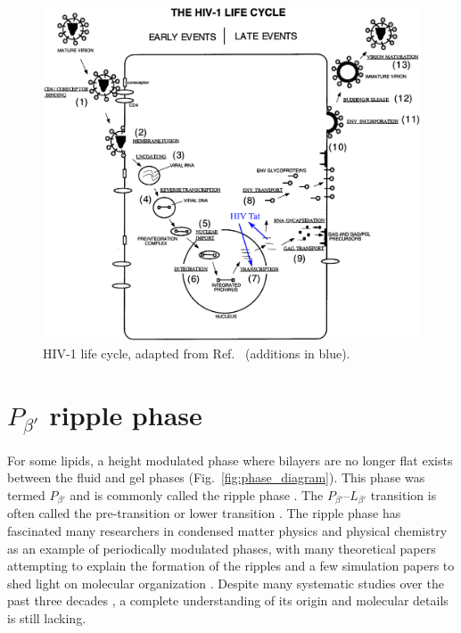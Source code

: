\begin{figure}[htbp]
  \centering
  \includegraphics[width=\textwidth]{figures/HIV_lifecycle}
  \caption{HIV-1 life cycle, adapted from Ref.~\cite{Freed98}
  (additions in blue).}
  \label{fig:HIV_lifecycle}
\end{figure}

\section{$P_{\beta'}$ ripple phase}
For some lipids, a height modulated phase where
bilayers are no longer flat exists between the fluid and gel phases
(Fig.~\ref{fig:phase_diagram}). 
This phase was termed $P_{\beta'}$ 
and is commonly called the ripple phase \cite{ref:Tardieu73}. 
The $P_{\beta'}$--$L_{\beta'}$ transition is often
called the pre-transition \cite{ref:Wack89} or lower transition \cite{Nagle00}.
The ripple phase has fascinated many researchers in condensed matter physics
and physical chemistry as an example of periodically modulated phases,
with many theoretical papers attempting to explain the formation
of the ripples 
\cite{ref:Doniach79,ref:Marder84,ref:Hawton86,ref:Carlson87,ref:Goldstein88,ref:McCullough90,ref:Honda91,ref:Lubensky93,ref:Kamal11}
and a few simulation papers to shed light on molecular organization \cite{ref:deVries05,ref:Lenz07}.
Despite many systematic studies over the past three decades
\cite{ref:Tardieu73,ref:Janiak76,ref:Copeland80,ref:Ruppel83,ref:Zasadzinski87,ref:Wack89,ref:Sun96,ref:Katsaras00,ref:Sengupta03}, 
a complete understanding of its origin and molecular details is still lacking.

